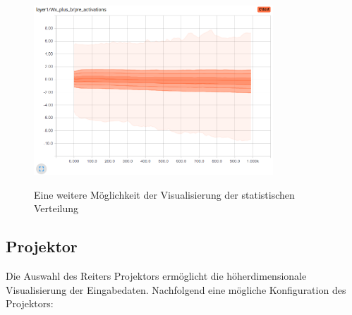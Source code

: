 \vspace{0.4cm}
\begin{figure}[h!]
	\centering
	 \includegraphics[width=0.8\textwidth]{images/Kapitel_3/distribution.png}\\
	\vspace{10pt} 
	\caption[Eine weitere Möglichkeit der Visualisierung der statistischen Verteilung]{Eine weitere Möglichkeit der Visualisierung der statistischen Verteilung}
	\label{fig:verteilung}
\end{figure}




\subsection{Projektor}


Die Auswahl des Reiters Projektors ermöglicht die höherdimensionale Visualisierung der Eingabedaten. Nachfolgend eine mögliche Konfiguration des Projektors:
\vspace{0.1cm}
\\

